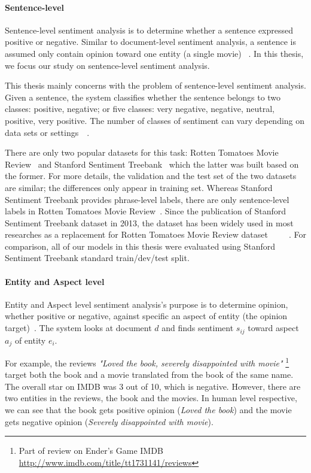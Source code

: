 \paragraph{Sentence-level}\label{sec:sent-level}
Sentence-level sentiment analysis is to determine whether a sentence expressed positive or negative. Similar to document-level sentiment analysis, a sentence is assumed only contain opinion toward one entity (a single movie) ~\cite{liu2012sentiment}.
In this thesis, we focus our study on sentence-level sentiment analysis.

This thesis mainly concerns with the problem of sentence-level sentiment analysis.
Given a sentence, the system classifies whether the sentence belongs to two classes: positive, negative; or five classes: very negative, negative, neutral, positive, very positive.
The number of classes of sentiment can vary depending on data sets or settings~\cite{Rotten-Tomato}~\cite{socher2013recursive}.

There are only two popular datasets for this task: Rotten Tomatoes Movie Review~\cite{Rotten-Tomato} and Stanford Sentiment Treebank~\cite{socher2013recursive} which the latter was built based on the former.
For more details, the validation and the test set of the two datasets are similar; the differences only appear in training set.
Whereas Stanford Sentiment Treebank provides phrase-level labels, there are only sentence-level labels in Rotten Tomatoes Movie Review~\cite{socher2013recursive}.
Since the publication of Stanford Sentiment Treebank dataset in 2013, the dataset has been widely used in most researches as a replacement for Rotten Tomatoes Movie Review dataset~\cite{treeLSTM}~\cite{KimCNN}~\cite{cnn-rnn}~\cite{2-layer-cnn}~\cite{socher2013recursive}.
For comparison, all of our models in this thesis were evaluated using Stanford Sentiment Treebank standard train/dev/test split.

\paragraph{Entity and Aspect level}
Entity and Aspect level sentiment analysis's purpose is to determine opinion, whether positive or negative, against specific an aspect of entity (the opinion target)~\cite{liu2012sentiment}. The system looks at document $d$ and finds sentiment $s_{ij}$ toward aspect $a_{j}$ of entity $e_{i}$.

For example, the reviews \textit{"Loved the book, severely disappointed with movie"} \footnote{Part of review on Ender's Game IMDB \url{http://www.imdb.com/title/tt1731141/reviews}} target both the book and a movie translated from the book of the same name. The overall star on IMDB was 3 out of 10, which is negative. However, there are two entities in the reviews, the book and the movies. In human level respective, we can see that the book gets positive opinion (\textit{Loved the book}) and the movie gets negative opinion (\textit{Severely disappointed with movie}).

